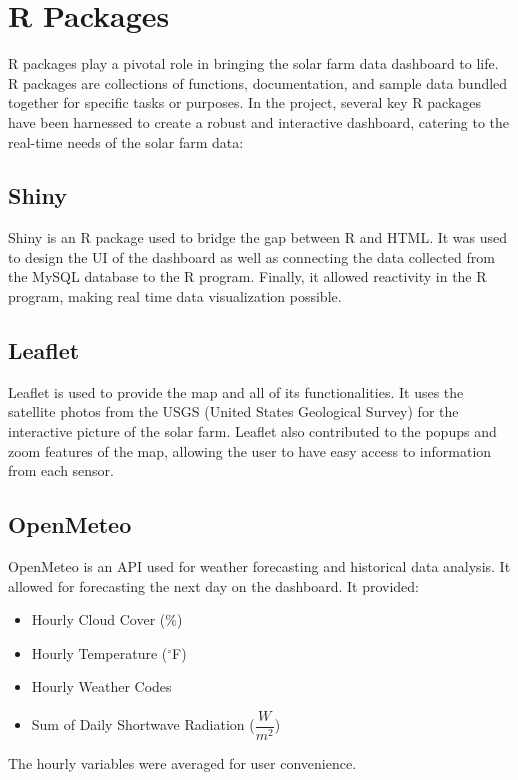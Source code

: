 \documentclass{sigchi}
\begin{document}
\section{R Packages}
R packages play a pivotal role in bringing the solar farm data dashboard to life. R packages are collections of functions, documentation, and sample data bundled together for specific tasks or purposes. In the project, several key R packages have been harnessed to create a robust and interactive dashboard, catering to the real-time needs of the solar farm data:

\subsection{Shiny}

Shiny is an R package used to bridge the gap between R and HTML. It was used to design the UI of the dashboard as well as connecting the data collected from the MySQL database to the R program. Finally, it allowed reactivity in the R program, making real time data visualization possible.\cite{10_R-Shiny}\cite{2_Wickham_2021}

\subsection{Leaflet}

Leaflet is used to provide the map and all of its functionalities. It uses the satellite photos from the USGS (United States Geological Survey) for the interactive picture of the solar farm. Leaflet also contributed to the popups and zoom features of the map, allowing the user to have easy access to information from each sensor.\cite{4_Leaflet}

\subsection{OpenMeteo}

OpenMeteo is an API used for weather forecasting and historical data analysis. It allowed for forecasting the next day on the dashboard. It provided:
\begin{itemize}
    \item Hourly Cloud Cover (\%)
    \item Hourly Temperature ($^{\circ}$F)
    \item Hourly Weather Codes
    \item Sum of Daily Shortwave Radiation ($\dfrac{W}{m^2}$)
\end{itemize} 
The hourly variables were averaged for user convenience.\cite{6_OpenMeteo}
\end{document}
